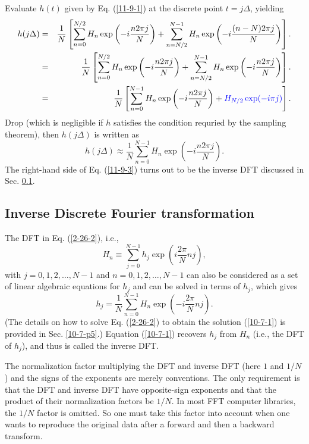 \documentclass{article}
\newcommand{\tmcolor}[2]{{\color{#1}{#2}}}
\begin{document}
Evaluate $h (t)$ given by Eq. (\ref{11-9-1}) at the discrete point $t = j
\Delta$, yielding
\begin{eqnarray}
  h (j \Delta) & = & \frac{1}{N} \left[ \sum_{n = 0}^{N / 2} H_n \exp \left( -
  i \frac{n 2 \pi j}{N} \right) + \sum_{n = N / 2}^{N - 1} H_n \exp \left( - i
  \frac{(n - N) 2 \pi j}{N} \right) \right] . \nonumber\\
  & = & \frac{1}{N} \left[ \sum_{n = 0}^{N / 2} H_n \exp \left( - i \frac{n 2
  \pi j}{N} \right) + \sum_{n = N / 2}^{N - 1} H_n \exp \left( - i \frac{n 2
  \pi j}{N} \right) \right] . \nonumber\\
  & = & \frac{1}{N} \left[ \sum_{n = 0}^{N - 1} H_n \exp \left( - i \frac{n 2
  \pi j}{N} \right) + \tmcolor{blue}{H_{N / 2} \exp (- i \pi j)} \right] . 
\end{eqnarray}
Drop \tmcolor{blue}{the blue term} (which is negligible if $h$ satisfies the
condition requried by the sampling theorem), then $h (j \Delta)$ is written as
\begin{equation}
  \label{11-9-3} h (j \Delta) \approx \frac{1}{N} \sum_{n = 0}^{N - 1} H_n
  \exp \left( - i \frac{n 2 \pi j}{N} \right) .
\end{equation}
The right-hand side of Eq. (\ref{11-9-3}) turns out to be the inverse DFT
discussed in Sec. \ref{11-9-2}.

\subsection{Inverse Discrete Fourier transformation}\label{11-9-2}

The DFT in Eq. (\ref{2-26-2}), i.e.,
\begin{equation}
  \label{21-9-15-p1} H_n \equiv \sum_{j = 0}^{N - 1} h_j \exp \left( i \frac{2
  \pi}{N} n j \right),
\end{equation}
with $j = 0, 1, 2, \ldots, N - 1$ and $n = 0, 1, 2, \ldots, N - 1$ can also be
considered as a set of linear algebraic equations for $h_j$ and can be solved
in terms of $h_j$, which gives
\begin{equation}
  \label{10-7-1} h_j = \frac{1}{N} \sum_{n = 0}^{N - 1} H_n \exp \left( - i
  \frac{2 \pi}{N} n j \right) .
\end{equation}
(The details on how to solve Eq. (\ref{2-26-2}) to obtain the solution
(\ref{10-7-1}) is provided in Sec. \ref{10-7-p5}.) Equation (\ref{10-7-1})
recovers $h_j$ from $H_n$ (i.e., the DFT of $h_j$), and thus is called the
inverse DFT.

The normalization factor multiplying the DFT and inverse DFT (here $1$ and $1
/ N$) and the signs of the exponents are merely conventions. The only
requirement is that the DFT and inverse DFT have opposite-sign exponents and
that the product of their normalization factors be $1 / N$. In most FFT
computer libraries, the $1 / N$ factor is omitted. So one must take this
factor into account when one wants to reproduce the original data after a
forward and then a backward transform.
\end{document}
